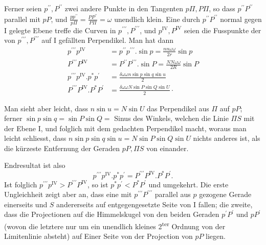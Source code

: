 Ferner seien \(p^{\prime\prime},P^{\prime\prime}\) zwei andere Punkte in den Tangenten \(p\Pi,P\Pi\), so dass \(p^{\prime\prime}P^{\prime\prime}\) parallel mit \(pP\), und \(\frac{pp^{\prime\prime}}{p\Pi}=\frac{PP^{\prime\prime}}{P\Pi}=\omega\) unendlich klein. Eine durch \(p^{\prime\prime}P^{\prime\prime}\) normal gegen I gelegte Ebene treffe die Curven in \(p^{\prime\prime\prime},P^{\prime\prime\prime}\), und \(p^{\mathrm{IV}},P^{\mathrm{IV}}\) seien die Fusspunkte der von \(p^{\prime\prime\prime},P^{\prime\prime\prime}\) auf I gefällten Perpendikel. Man hat dann
\[
\begin{aligned}
p^{\prime\prime\prime}p^{\mathrm{IV}}&=p^{\prime\prime}p^{\prime\prime\prime}\mathord{.}\sin p=\frac{nn\omega\omega}{2r}\sin p\\[5pt]
P^{\prime\prime\prime}P^{\mathrm{IV}}&=P^{\prime\prime}P^{\prime\prime\prime}\mathord{.}\sin P=\frac{NN\omega\omega}{2R}\sin P\\[5pt]
p^{\prime\prime\prime}p^{\mathrm{IV}}\mathord{.}p^{*}p^{\prime}&=\frac{\delta\omega\omega n\sin p\sin q\sin u}{2}\\[5pt]
P^{\prime\prime\prime}P^{\mathrm{IV}}\mathord{.}P^{*}P^{\prime}&=\frac{\delta\omega\omega N\sin P\sin Q\sin U}{2}\mathpunct{\cdot}
\end{aligned}
\]

Man sieht aber leicht, dass \(n\sin u=N\sin U\) das Perpendikel aus \(\Pi\) auf \(pP\); ferner \(\sin p\sin q=\sin P\sin Q={}\) Sinus des Winkels, welchen die Linie \(\Pi S\) mit der Ebene I, und folglich mit dem gedachten Perpendikel macht, woraus man leicht schliesst, dass \(n\sin p\sin q\sin u=N\sin P\sin Q\sin U\) nichts anderes ist, als die kürzeste Entfernung der Geraden \(pP,\Pi S\) von einander.

Endresultat ist also
\[
p^{\prime\prime\prime}p^{\mathrm{IV}}\mathord{.}p^{*}p^{\prime}=P^{\prime\prime\prime}P^{\mathrm{IV}}\mathord{.}P^{*}P^{\prime}.
\]
Ist folglich \(p^{\prime\prime\prime}p^{\mathrm{IV}}>P^{\prime\prime\prime}P^{\mathrm{IV}}\), so ist \(p^{*}p^{\prime}<P^{*}P^{\prime}\) und umgekehrt. Die erste Ungleichheit zeigt aber an, dass eine mit \(p^{\prime\prime\prime}P^{\prime\prime\prime}\) parallel aus \(p\) gezogene Gerade einerseits und \(S\) andererseits auf entgegengesetzte Seite von I fallen; die zweite, dass die Projectionen auf die Himmelskugel von den beiden Geraden \(p^{\prime}P^{\prime}\) und \(pP^{\prime}\) (wovon die letztere nur um ein unendlich kleines 2\textsuperscript{ter} Ordnung von der Limitenlinie absteht) auf Einer Seite von der Projection von \(pP\) liegen.

